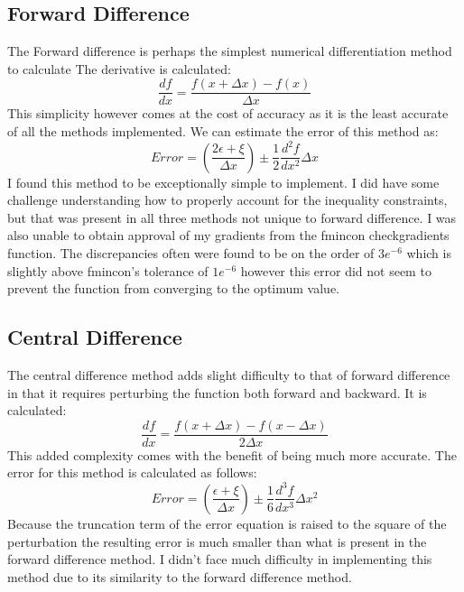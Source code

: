 \documentclass{article}
\begin{document}
\subsection{Forward Difference}
The Forward difference is perhaps the simplest numerical differentiation method to calculate The derivative is calculated:
\begin{equation}
\frac{df}{dx} = \frac{f\left(x + \Delta x\right) - f(x)}{\Delta x}
\end{equation}
This simplicity however comes at the cost of accuracy as it is the least accurate of all the methods implemented. We can estimate the error of this method as:
\begin{equation}
Error = \left(\frac{2\epsilon + \xi}{\Delta x}\right) \pm \frac{1}{2} \frac{d^2 f}{dx^2}\Delta x
\end{equation}
I found this method to be exceptionally simple to implement.  I did have some challenge understanding how to properly account for the inequality constraints, but that was present in all three methods not unique to forward difference.  I was also unable to obtain approval of my gradients from the fmincon checkgradients function.  The discrepancies often were found to be on the order of $3e^{-6}$ which is slightly above fmincon's tolerance of $1e^{-6}$ however this error did not seem to prevent the function from converging to the optimum value.
\subsection{Central Difference}
The central difference method adds slight difficulty to that of forward difference in that it requires perturbing the function both forward and backward.  It is calculated:
\begin{equation}
\frac{df}{dx} = \frac{f\left(x + \Delta x\right) - f\left(x - \Delta x\right)}{2\Delta x}
\end{equation}
This added complexity comes with the benefit of being much more accurate.  The error for this method is calculated as follows:
\begin{equation}
Error = \left(\frac{\epsilon + \xi}{\Delta x}\right) \pm \frac{1}{6} \frac{d^3 f}{dx^3}\Delta x^2
\end{equation}
Because the truncation term of the error equation is raised to the square of the perturbation the resulting error is much smaller than what is present in the forward difference method.  I didn't face much difficulty in implementing this method due to its similarity to the forward difference method.
\end{document}
